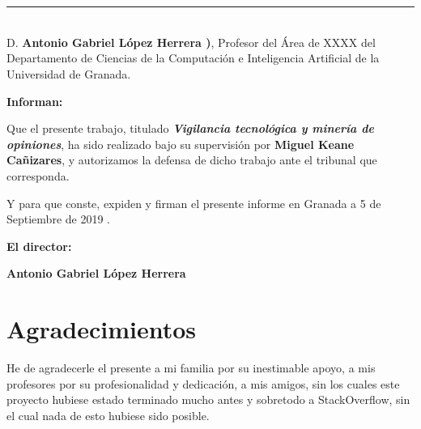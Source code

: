 \chapter*{}
\thispagestyle{empty}

\noindent\rule[-1ex]{\textwidth}{2pt}\\[4.5ex]

D. \textbf{Antonio Gabriel López Herrera )}, Profesor del Área de XXXX del Departamento de Ciencias de la Computación e Inteligencia Artificial de la Universidad de Granada.

\vspace{0.5cm}



\vspace{0.5cm}

\textbf{Informan:}

\vspace{0.5cm}

Que el presente trabajo, titulado \textit{\textbf{Vigilancia tecnológica y minería de opiniones}},
ha sido realizado bajo su supervisión por \textbf{Miguel Keane Cañizares}, y autorizamos la defensa de dicho trabajo ante el tribunal
que corresponda.

\vspace{0.5cm}

Y para que conste, expiden y firman el presente informe en Granada a 5 de Septiembre de 2019 .

\vspace{1cm}

\textbf{El director:}

\vspace{5cm}

\noindent \textbf{Antonio Gabriel López Herrera }%

\chapter*{Agradecimientos}
\thispagestyle{empty}

       \vspace{1cm}


He de agradecerle el presente a mi familia por su inestimable apoyo, a mis profesores por su profesionalidad y dedicación, a mis amigos, sin los cuales este proyecto hubiese estado terminado mucho antes y sobretodo a StackOverflow, sin el cual nada de esto hubiese sido posible. 

